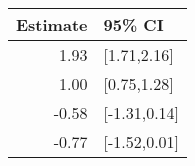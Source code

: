 \begin{tabular}{rl}
  \hline
Estimate & 95\% CI \\ 
  \hline
1.93 & [1.71,2.16] \\ 
  1.00 & [0.75,1.28] \\ 
  -0.58 & [-1.31,0.14] \\ 
  -0.77 & [-1.52,0.01] \\ 
   \hline
\end{tabular}

